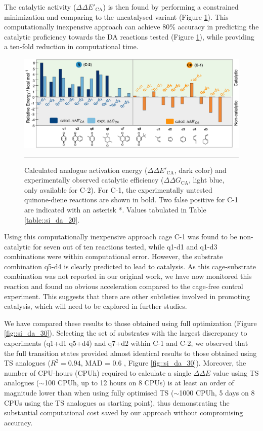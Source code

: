 \documentclass[../../main.tex]{subfiles}
\begin{document}
The catalytic activity ($\Delta\Delta E'_\text{CA}$) is then found by performing a constrained minimization and comparing to the uncatalysed variant (Figure \ref{fig::da_7}). This computationally inexpensive approach can achieve 80\% accuracy in predicting the catalytic proficiency towards the DA reactions tested (Figure \ref{fig::da_7}), while providing a ten-fold reduction in computational time.


\begin{figure}[h!]
	\vspace{0.4cm}
	\centering
	\includegraphics[width=\textwidth]{3/da//figs/fig7/fig7}
	\vspace{0.2cm}
	\hrule
	\caption{Calculated analogue activation energy ($\Delta\Delta E'_\text{CA}$, dark color) and experimentally observed catalytic efficiency ($\Delta\Delta G_\text{CA}$, light blue, only available for C-2). For C-1, the experimentally untested quinone-diene reactions are shown in bold. Two false positive for C-1 are indicated with an asterisk *. Values tabulated in Table \ref{table::si_da_20}.}
	\label{fig::da_7}
\end{figure}


Using this computationally inexpensive approach cage C-1 was found to be non-catalytic for seven out of ten reactions tested, while q1-d1 and q1-d3 combinations were within computational error. However, the substrate combination q5-d4 is clearly predicted to lead to catalysis. As this cage-substrate combination was not reported in our original work,\cite{MartCentelles2018} we have now monitored this reaction and found no obvious acceleration compared to the cage-free control experiment. This suggests that there are other subtleties involved in promoting catalysis, which will need to be explored in further studies. 

We have compared these results to those obtained using full optimization (Figure \ref{fig::si_da_30}). Selecting the set of substrates with the largest discrepancy to experiments (q1+d1 q5+d4) and q7+d2 within C-1 and C-2, we observed that the full transition states provided almost identical results to those obtained using TS analogues ($R^2 =0.94$, MAD = 0.6 \kcalx, Figure \ref{fig::si_da_30}). Moreover, the number of CPU-hours (CPUh) required to calculate a single $\Delta\Delta E$ value using TS analogues ($\sim$100 CPUh, up to 12 hours on 8 CPUs) is at least an order of magnitude lower than when using fully optimised TS ($\sim$1000 CPUh, 5 days on 8 CPUs using the TS analogues as starting point), thus demonstrating the substantial computational cost saved by our approach without compromising accuracy. 
\end{document}
